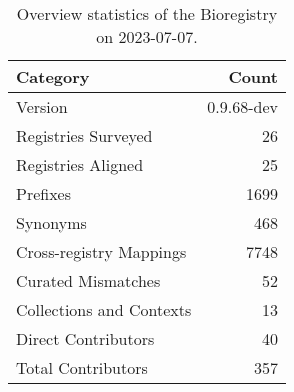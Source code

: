 \begin{table}
\caption{Overview statistics of the Bioregistry on 2023-07-07.}
\label{tab:bioregistry-summary}
\begin{tabular}{lr}
\toprule
Category & Count \\
\midrule
Version & 0.9.68-dev \\
Registries Surveyed & 26 \\
Registries Aligned & 25 \\
Prefixes & 1699 \\
Synonyms & 468 \\
Cross-registry Mappings & 7748 \\
Curated Mismatches & 52 \\
Collections and Contexts & 13 \\
Direct Contributors & 40 \\
Total Contributors & 357 \\
\bottomrule
\end{tabular}
\end{table}
